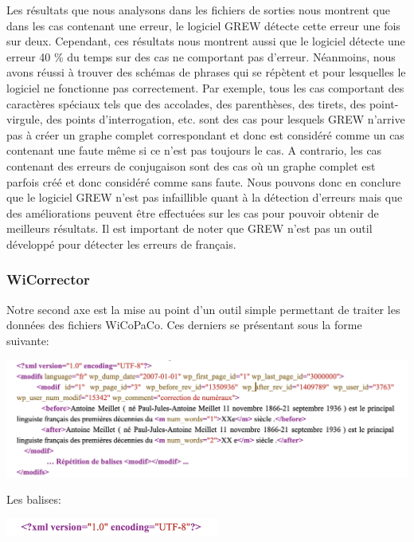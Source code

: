 \documentclass[11pt]{article}
\begin{document}
Les r\'{e}sultats que nous analysons dans les fichiers de sorties nous montrent que dans les cas contenant une erreur, le logiciel GREW d\'{e}tecte cette erreur une fois sur deux. Cependant, ces r\'{e}sultats nous montrent aussi que le logiciel d\'{e}tecte une erreur 40 \% du temps sur des cas ne comportant pas d'erreur. N\'{e}anmoins, nous avons r\'{e}ussi \`{a} trouver des sch\'{e}mas de phrases qui se r\'{e}p\`{e}tent et pour lesquelles le logiciel ne fonctionne pas correctement. Par exemple, tous les cas comportant des caract\`{e}res sp\'{e}ciaux tels que des accolades, des parenth\`{e}ses, des tirets, des point-virgule, des points d'interrogation, etc. sont des cas pour lesquels GREW n'arrive pas \`{a} cr\'{e}er un graphe complet correspondant et donc est consid\'{e}r\'{e} comme un cas contenant une faute m\^{e}me si ce n'est pas toujours le cas. A contrario, les cas contenant des erreurs de conjugaison sont des cas o\`{u} un graphe complet est parfois cr\'{e}\'{e} et donc consid\'{e}r\'{e} comme sans faute. Nous pouvons donc en conclure que le logiciel GREW n'est pas infaillible quant \`{a} la d\'{e}tection d'erreurs mais que des am\'{e}liorations peuvent \^{e}tre effectu\'{e}es sur les cas pour pouvoir obtenir de meilleurs r\'{e}sultats. Il est important de noter que GREW n'est pas un outil d\'{e}velopp\'{e} pour d\'{e}tecter les erreurs de fran\c{c}ais.


\subsubsection{WiCorrector}
Notre second axe est la mise au point d'un outil simple permettant de traiter les donn\'{e}es des fichiers WiCoPaCo. Ces derniers se pr\'{e}sentant sous la forme suivante:
\begin{center}
\includegraphics[width=14cm]{exemple4.png} %
\end{center}

Les balises:
\begin{center}
\includegraphics[width=7cm]{exemple5.png} %
\end{center}
\end{document}
